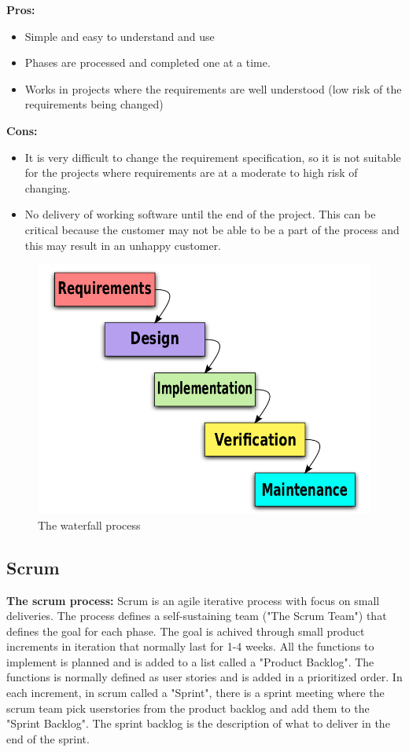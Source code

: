 {\bf Pros: }
\begin{itemize}
	\item Simple and easy to understand and use
	\item Phases are processed and completed one at a time.
	\item Works in projects where the requirements are well understood (low risk of the requirements being changed)
\end{itemize}

{\bf Cons: }
\begin{itemize}
	\item It is very difficult to change the requirement specification, so it is not suitable for the projects where requirements are at a moderate to high risk of changing.
	\item No delivery of working software until the end of the project. This can be critical because the customer may not
	be able to be a part of the process and this may result in an unhappy customer.
\end{itemize}

\begin{figure}[!ht]
\centering
\includegraphics[scale=0.3]{pictures/Waterfall_model.png}
\caption{The waterfall process}
\label{overflow}
\end{figure}


\subsection{Scrum}
{\bf The scrum process: } Scrum is an agile iterative process with focus on small deliveries. The process
defines a self-sustaining team ("The Scrum Team") that defines the goal for each phase. The goal 
is achived through small product increments in iteration that normally last for 1-4 weeks. 
All the functions to implement is planned and is added to a list called a "Product Backlog". The
functions is normally defined as user stories and is added in a prioritized order. In each increment, 
in scrum called a "Sprint", there is a sprint meeting where the scrum team pick userstories from the 
product backlog and add them to the "Sprint Backlog". The sprint backlog is the description of what 
to deliver in the end of the sprint.

